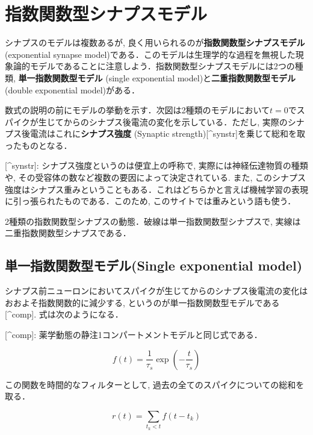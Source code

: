 \section{指数関数型シナプスモデル}
シナプスのモデルは複数あるが, 良く用いられるのが\textbf{指数関数型シナプスモデル}(exponential synapse model)である．このモデルは生理学的な過程を無視した現象論的モデルであることに注意しよう．指数関数型シナプスモデルには2つの種類, \textbf{単一指数関数型モデル} (single exponential model)と\textbf{二重指数関数型モデル} (double exponential model)がある．

数式の説明の前にモデルの挙動を示す．次図は2種類のモデルにおいて$t=0$でスパイクが生じてからのシナプス後電流の変化を示している．ただし, 実際のシナプス後電流はこれに\textbf{シナプス強度} (Synaptic strength)[^synstr]を乗じて総和を取ったものとなる．

[^synstr]: シナプス強度というのは便宜上の呼称で, 実際には神経伝達物質の種類や, その受容体の数など複数の要因によって決定されている. また, このシナプス強度はシナプス重みということもある．これはどちらかと言えば機械学習の表現に引っ張られたものである．このため, このサイトでは重みという語も使う．




2種類の指数関数型シナプスの動態．破線は単一指数関数型シナプスで, 実線は二重指数関数型シナプスである．
\subsection{単一指数関数型モデル(Single exponential model)}
シナプス前ニューロンにおいてスパイクが生じてからのシナプス後電流の変化はおおよそ指数関数的に減少する, というのが単一指数関数型モデルである [^comp]. 式は次のようになる．

[^comp]: 薬学動態の静注1コンパートメントモデルと同じ式である．


\begin{equation}
f(t)=\frac{1}{\tau_{s}}\exp\left(-\frac{t}{\tau_s}\right)    
\end{equation}


この関数を時間的なフィルターとして, 過去の全てのスパイクについての総和を取る．


\begin{equation}
r(t)=\sum_{t_{k}< t} f\left(t-t_{k}\right)
\end{equation}


